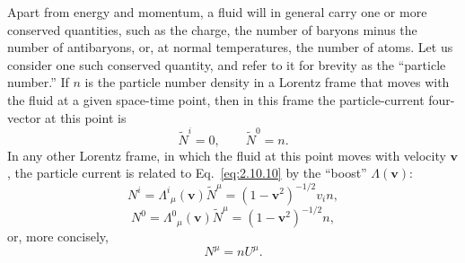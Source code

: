 Apart from energy and momentum, a fluid will in general carry one or more
conserved quantities, such as the charge, the number of baryons minus the number
of antibaryons, or, at normal temperatures, the number of atoms. Let us
consider one such conserved quantity, and refer to it for brevity as the
``particle number.'' If \(n\) is the particle number density in a Lorentz frame
that moves with the fluid at a given space-time point, then in this frame the
particle-current four-vector at this point is
\begin{equation}
  \widetilde N^i=0,\qquad \widetilde N^0=n .
  \tag{2.10.10}\label{eq:2.10.10}
\end{equation}
In any other Lorentz frame, in which the fluid at this point moves with velocity
\(\mathbf v\), the particle current is related to Eq.~\eqref{eq:2.10.10} by
the ``boost'' \(\Lambda(\mathbf v)\):
\begin{equation}
  N^i=\Lambda^i{}_\mu(\mathbf v)\widetilde N^\mu
  =(1-\mathbf v^2)^{-1/2}v_i n ,
  \tag{2.10.11}\label{eq:2.10.11}
\end{equation}
\begin{equation}
  N^0=\Lambda^0{}_\mu(\mathbf v)\widetilde N^\mu
  =(1-\mathbf v^2)^{-1/2}n ,
  \tag{2.10.12}\label{eq:2.10.12}
\end{equation}
or, more concisely,
\begin{equation}
  N^\mu=nU^\mu .
  \tag{2.10.13}\label{eq:2.10.13}
\end{equation}

